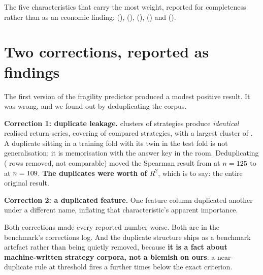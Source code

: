 \documentclass[11pt,a4paper]{article}
\begin{document}
The five characteristics that carry the most weight, reported for completeness rather than as an
economic finding: \texttt{\rsImportanceFirstName} (\rsImportanceFirstValue),
\texttt{\rsImportanceSecondName} (\rsImportanceSecondValue),
\texttt{\rsImportanceThirdName} (\rsImportanceThirdValue),
\texttt{\rsImportanceFourthName} (\rsImportanceFourthValue) and
\texttt{\rsImportanceFifthName} (\rsImportanceFifthValue).

\section{Two corrections, reported as findings}
\label{sec:corrections}

\begin{selfreport}[title={Our first answer was better, and wrong}]
The first version of the fragility predictor produced a modest positive result. It was wrong, and
we found out by deduplicating the corpus.

\textbf{Correction 1: duplicate leakage.} \rsDuplicateClusters{} clusters of strategies produce
\emph{identical} realised return series, covering \rsDuplicateMembers{} of
\rsDuplicateCompared{} compared strategies, with a largest cluster of
\rsLargestDuplicateCluster{}. A duplicate sitting in a training fold with its twin in the test fold
is not generalisation; it is memorisation with the answer key in the room. Deduplicating
(\rsDuplicateRemoved{} rows removed, \rsDuplicateUncompared{} not comparable) moved the Spearman
result from \rsLeakageWithDuplicates{} at $n=125{}$ to
\rsLeakageWithoutDuplicates{} at $n=109{}$. \textbf{The duplicates were worth
\rsLeakageDelta{} of $R^2$}, which is to say: the entire original result.

\textbf{Correction 2: a duplicated feature.} One feature column duplicated another under a
different name, inflating that characteristic's apparent importance.

Both corrections made every reported number worse. Both are in the benchmark's corrections log.
And the duplicate structure ships as a benchmark artefact rather than being quietly removed,
because \textbf{it is a fact about machine-written strategy corpora, not a blemish on ours}: a
near-duplicate rule at threshold \rsNearDuplicateThreshold{} fires a further
\rsNearDuplicatePairs{} times below the exact criterion.
\end{selfreport}
\end{document}

